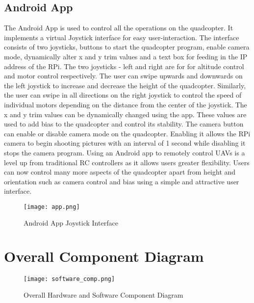 \subsection{Android App}
The Android App is used to control all the operations on the quadcopter. It implements a virtual Joystick interface for easy user-interaction.
The interface consists of two joysticks, buttons to start the quadcopter program, enable camera mode, dynamically alter x and y trim values and a text box for feeding in the IP address of the RPi.
\newline
The two joysticks - left and right are for for altitude control and motor control respectively. The user can swipe upwards and downwards on the left joystick to increase and decrease the height of the quadcopter.  Similarly, the user can swipe in all directions on the right joystick to control the speed of individual motors depending on the distance from the center of the joystick. 
\newline
The x and y trim values can be dynamically changed using the app. These values are used to add bias to the quadcopter and control its stability. 
\newline
The camera button can enable or disable camera mode on the quadcopter. Enabling it allows the RPi camera to begin shooting pictures with an interval of 1 second while disabling it stops the camera program.
\newline
Using an Android app to remotely control UAVs is a level up from traditional RC controllers as it allows users greater flexibility. Users can now control many more aspects of the quadcopter apart from height and orientation such as camera control and bias using a simple and attractive user interface.

\begin{figure}[H]
  \centering
  \texttt{[image: app.png]}
  \caption{Android App Joystick Interface}
  \label{app} 
\end{figure}

\section{Overall Component Diagram}

\begin{figure}[H]
  \centering
  \texttt{[image: software\_comp.png]}
  \caption{Overall Hardware and Software Component Diagram}
  \label{Software Flow}	
\end{figure}


